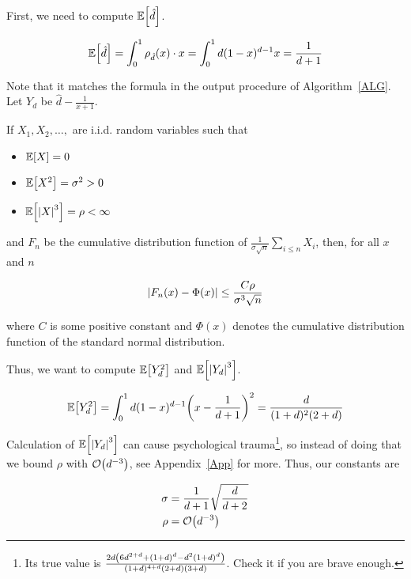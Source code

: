 First, we need to compute $\Ex{\hat d}$.

\begin{equation*}
	\Ex{\hat d} = \int_0^1 \rho_{\hat d}(x) \cdot x = \int_0^1 d (1 - x)^{d - 1} x = \frac{1}{d + 1}
\end{equation*}

Note that it matches the formula in the output procedure of Algorithm~\ref{ALG}. Let $Y_d$ be $\hat d - \frac{1}{x + 1}$.

\begin{theorem}\label{BE}
	If $X_1, X_2, \ldots, $ are i.i.d. random variables such that

	\begin{itemize}
		\item $\Ex{X} = 0$

		\item $\Ex{X^2} = \sigma^2 > 0$

		\item $\Ex{\abs*{X}^3} = \rho < \infty$
	\end{itemize}

	and $F_n$ be the cumulative distribution function of $\frac{1}{\sigma \sqrt{n}} \sum_{i \leq n} X_i$, then, for all $x$ and $n$

	\begin{equation*}
		\abs*{F_n(x) - \Phi(x)} \leq \frac{C \rho}{\sigma^3 \sqrt{n}}
	\end{equation*}

	where $C$ is some positive constant and $\Phi(x)$ denotes the cumulative distribution function of the standard normal distribution.
\end{theorem}

Thus, we want to compute $\Ex{Y_d^2}$ and $\Ex{\abs*{Y_d}^3}$.

\begin{equation*}
	\Ex{Y_d^2} = \int_{0}^{1} d (1 - x)^{d - 1} \parens*{x - \frac{1}{d + 1}}^2 = \frac{d}{(1 + d)^2 (2 + d)}
\end{equation*}

Calculation of $\Ex{\abs*{Y_d}^3}$ can cause psychological trauma\footnote{Its true value is $\frac{2 d \parens*{ 6 d^{2 + d} + (1 + d)^d - d^2 (1 + d)^d }}{(1 + d)^{4 + d} (2 + d) (3 + d)}$. Check it if you are brave enough.}, so instead of doing that we bound $\rho$ with $\BigO \parens*{d^{-3}}$, see Appendix~\ref{App} for more. Thus, our constants are

\begin{align*}
	\sigma & = \frac{1}{d + 1}\sqrt{\frac{d}{d + 2}} \\
	\rho   & = \BigO \parens*{d^{-3}}
\end{align*}

